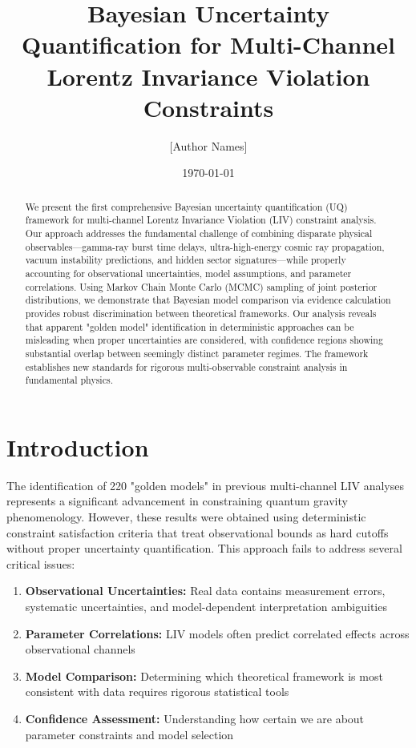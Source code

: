 \documentclass[12pt]{article}
\title{Bayesian Uncertainty Quantification for Multi-Channel \\ Lorentz Invariance Violation Constraints}
\author{[Author Names]}
\date{\today}
\begin{document}
\maketitle

\begin{abstract}
We present the first comprehensive Bayesian uncertainty quantification (UQ) framework for multi-channel Lorentz Invariance Violation (LIV) constraint analysis. Our approach addresses the fundamental challenge of combining disparate physical observables—gamma-ray burst time delays, ultra-high-energy cosmic ray propagation, vacuum instability predictions, and hidden sector signatures—while properly accounting for observational uncertainties, model assumptions, and parameter correlations. Using Markov Chain Monte Carlo (MCMC) sampling of joint posterior distributions, we demonstrate that Bayesian model comparison via evidence calculation provides robust discrimination between theoretical frameworks. Our analysis reveals that apparent "golden model" identification in deterministic approaches can be misleading when proper uncertainties are considered, with confidence regions showing substantial overlap between seemingly distinct parameter regimes. The framework establishes new standards for rigorous multi-observable constraint analysis in fundamental physics.
\end{abstract}

\section{Introduction}

The identification of 220 "golden models" in previous multi-channel LIV analyses represents a significant advancement in constraining quantum gravity phenomenology. However, these results were obtained using deterministic constraint satisfaction criteria that treat observational bounds as hard cutoffs without proper uncertainty quantification. This approach fails to address several critical issues:

\begin{enumerate}
\item \textbf{Observational Uncertainties:} Real data contains measurement errors, systematic uncertainties, and model-dependent interpretation ambiguities
\item \textbf{Parameter Correlations:} LIV models often predict correlated effects across observational channels
\item \textbf{Model Comparison:} Determining which theoretical framework is most consistent with data requires rigorous statistical tools
\item \textbf{Confidence Assessment:} Understanding how certain we are about parameter constraints and model selection
\end{enumerate}
\end{document}
